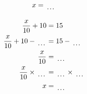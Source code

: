 \documentclass[12pt]{article}
\newcounter{minipagecount}
\begin{document}
\begin{multicols}{2}
\begin{minipage}[t]{0.45\textwidth}
\begin{align*}
        x &= \dotuline{\hspace{5mm}}\\
    \end{align*}
\end{minipage} %
\noindent{(\theminipagecount)}\hspace{0.1mm} %
\begin{minipage}[t]{0.45\textwidth} %
    \vspace{-26pt}  %
    \raggedright %
    \begin{align*} %
        \frac{x}{10} + 10 &= 15\\
        \frac{x}{10} + 10 - \dotuline{\hspace{5mm}} &= 15 - \dotuline{\hspace{5mm}}\\
        \frac{x}{10} &= \dotuline{\hspace{5mm}}\\
        \frac{x}{10} \times\dotuline{\hspace{5mm}} &= \dotuline{\hspace{5mm}} \times\dotuline{\hspace{5mm}}\\
        x &= \dotuline{\hspace{5mm}}\\
    \end{align*}
\end{minipage}\columnbreak
\noindent{(\theminipagecount)}\hspace{0.1mm} %
\begin{minipage}[t]{0.45\textwidth} %
    \vspace{-26pt}  %

\end{minipage}
\end{multicols}
\end{document}
